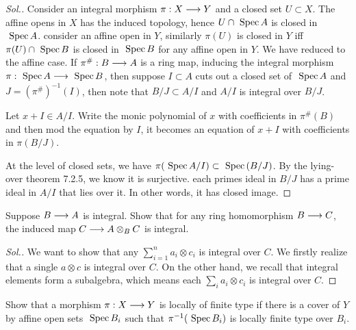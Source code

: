 \documentclass[11pt]{book} %
\begin{document}
\begin{proof}[Sol.]
Consider an integral morphism $\pi:X\longrightarrow Y$ and a closed set $U\subset X$. The affine opens in $X$ has the induced topology, hence $U\cap \text{ Spec\,} A$ is closed in $\text{ Spec\,} A$. consider an affine open in $Y$, similarly $\pi(U)$ is closed in $Y$ iff $\pi(U)\cap\text{ Spec\,} B$ is closed in $\text{ Spec\,} B$ for any affine open in $Y$. We have reduced to the affine case. If $\pi^\#:B\longrightarrow A$ is a ring map, inducing the integral morphism $\pi:\text{ Spec\,} A\longrightarrow \text{ Spec\,} B$, then suppose $I\subset A$ cuts out a closed set of $\text{ Spec\,} A$ and $J=(\pi^{\#})^{-1}(I)$, then note that $B/J\subset A/I$ and $A/I$ is integral over $B/J$.

Let $x+I\in A/I$. Write the monic polynomial of $x$ with coefficients in $\pi^\#(B)$ and then mod the equation by $I$, it becomes an equation of $x+I$ with coefficients in $\pi(B/J)$.

At the level of closed sets, we have $\pi(\text{ Spec\,} A/I)\subset \text{ Spec\,}(B/J)$. By the lying-over theorem 7.2.5, we know it is surjective. each primes ideal in $B/J$ has a prime ideal in $A/I$ that lies over it. In other words, it has closed image. 
\end{proof}
\begin{exr}
Suppose $B\longrightarrow A$ is integral. Show that for any ring homomorphism $B\longrightarrow C$, the induced map $C\longrightarrow A\otimes_B C$ is integral.
\end{exr}
\begin{proof}[Sol.]
We want to show that any $\sum_{i=1}^n a_i\otimes c_i$ is integral over $C$. We firstly realize that a single $a\otimes c$ is integral over $C$.  On the other hand, we recall that integral elements form a subalgebra, which means each $\sum_i a_i\otimes c_i$ is integral over $C$.
\end{proof}
\begin{exr}
Show that a morphism $\pi:X\longrightarrow Y$ is locally of finite type if there is a cover of $Y$ by affine open sets $\text{ Spec\,} B_i$ such that $\pi^{-1}(\text{ Spec\,} B_i)$ is locally finite type over $B_i$.
\end{exr}
\end{document}
